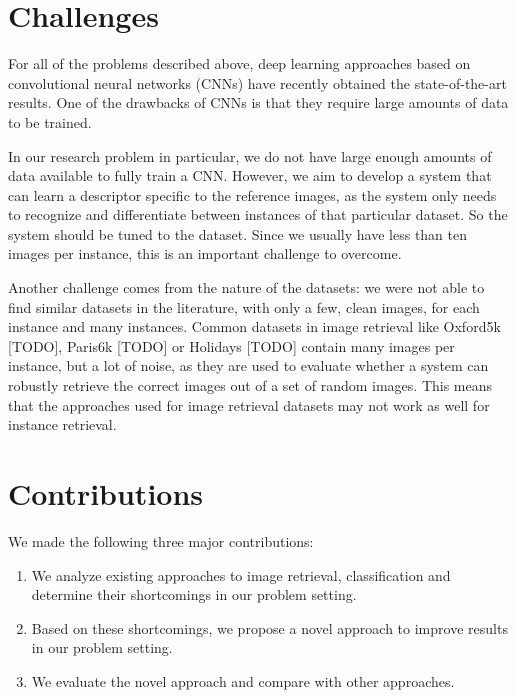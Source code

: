 
\section{Challenges}
For all of the problems described above, deep learning approaches
based on convolutional neural networks (CNNs) have recently obtained
the state-of-the-art results. One of the drawbacks of CNNs is that
they require large amounts of data to be trained.

In our research problem in particular, we do not
have large enough amounts of data available to fully train a CNN.
However, we aim to develop a system that can learn a descriptor
specific to the reference images,
as the system only needs to recognize and differentiate between
instances of that particular dataset. So the system should be tuned to
the dataset. Since we usually have less than ten images per instance,
this is an important challenge to overcome.

Another challenge comes from the nature of the datasets: we were not
able to find similar datasets in the literature, with only a few,
clean images, for each instance and many instances.
Common datasets in image retrieval like Oxford5k [TODO], Paris6k [TODO]
or Holidays [TODO] contain many images per instance, but a lot of noise,
as they are used to evaluate whether a system can robustly retrieve the
correct images out of a set of random images.
This means that the approaches used for image retrieval datasets may
not work as well for instance retrieval.

\section{Contributions}
We made the following three major contributions:
\begin{enumerate}
    \item We analyze existing approaches to image retrieval, classification
    and determine their shortcomings in our problem setting.
    \item Based on these shortcomings, we propose a novel approach
    to improve results in our problem setting.
    \item We evaluate the novel approach and compare with other approaches.
\end{enumerate}
